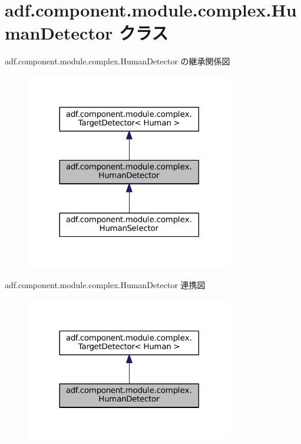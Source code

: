 \hypertarget{classadf_1_1component_1_1module_1_1complex_1_1HumanDetector}{}\section{adf.\+component.\+module.\+complex.\+Human\+Detector クラス}
\label{classadf_1_1component_1_1module_1_1complex_1_1HumanDetector}


adf.\+component.\+module.\+complex.\+Human\+Detector の継承関係図
\nopagebreak
\begin{figure}[H]
\begin{center}
\leavevmode
\includegraphics[width=257pt]{classadf_1_1component_1_1module_1_1complex_1_1HumanDetector__inherit__graph}
\end{center}
\end{figure}


adf.\+component.\+module.\+complex.\+Human\+Detector 連携図
\nopagebreak
\begin{figure}[H]
\begin{center}
\leavevmode
\includegraphics[width=257pt]{classadf_1_1component_1_1module_1_1complex_1_1HumanDetector__coll__graph}
\end{center}
\end{figure}
